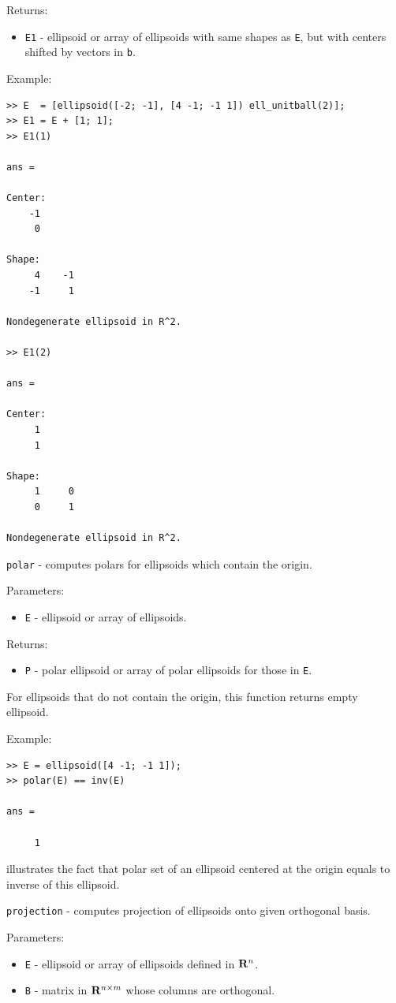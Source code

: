 \documentclass{report}
\begin{document}
Returns:
\begin{itemize}
\item {\tt E1} - ellipsoid or array of ellipsoids with same shapes as {\tt E},
but with centers shifted by vectors in {\tt b}.
\end{itemize}

Example:
{\tt \begin{verbatim}
>> E  = [ellipsoid([-2; -1], [4 -1; -1 1]) ell_unitball(2)];
>> E1 = E + [1; 1];
>> E1(1)

ans =

Center:
    -1
     0

Shape:
     4    -1
    -1     1

Nondegenerate ellipsoid in R^2.

>> E1(2)

ans =

Center:
     1
     1

Shape:
     1     0
     0     1

Nondegenerate ellipsoid in R^2.
\end{verbatim} }

\newpage

{\Large {\tt polar}} - computes polars for ellipsoids which contain the origin.

Parameters:
\begin{itemize}
\item {\tt E} - ellipsoid or array of ellipsoids.
\end{itemize}

Returns:
\begin{itemize}
\item {\tt P} - polar ellipsoid or array of polar ellipsoids for those
in {\tt E}.
\end{itemize}

For ellipsoids that do not contain the origin, this function returns empty
ellipsoid.

Example:
{\tt \begin{verbatim}
>> E = ellipsoid([4 -1; -1 1]);
>> polar(E) == inv(E)

ans =

     1
\end{verbatim} }
illustrates the fact that polar set of an ellipsoid centered at the origin
equals to inverse of this ellipsoid.

\newpage

{\Large {\tt projection}} - computes projection of ellipsoids onto given
orthogonal basis.

Parameters:
\begin{itemize}
\item {\tt E} - ellipsoid or array of ellipsoids defined in ${\bf R}^n$.
\item {\tt B} - matrix in ${\bf R}^{n\times m}$ whose columns are orthogonal.
\end{itemize}
\end{document}

